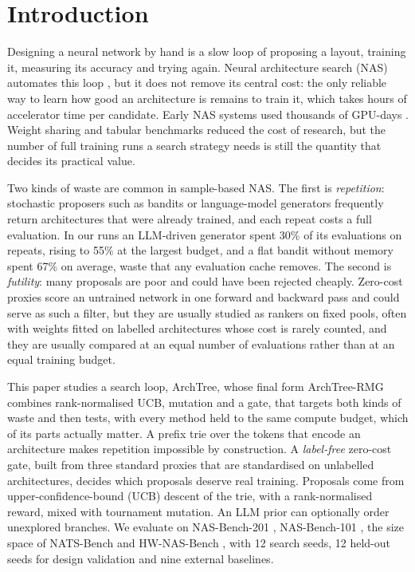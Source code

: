 \documentclass{sadhana}
\newcommand{\algname}{ArchTree}
\newcommand{\rmg}{ArchTree-RMG}
\begin{document}
\corres
\volnum{}
\issuenum{}
\monthyear{}
\pgfirst{}
\pglast{}
\doinum{}
\articleType{}


\section{Introduction}\label{sec:intro}

Designing a neural network by hand is a slow loop of proposing a layout, training it, measuring its accuracy and trying again. Neural architecture search (NAS) automates this loop \cite{zoph2017,elsken2019,ren2021}, but it does not remove its central cost: the only reliable way to learn how good an architecture is remains to train it, which takes hours of accelerator time per candidate. Early NAS systems used thousands of GPU-days \cite{zoph2017,real2017}. Weight sharing \cite{pham2018,liu2019} and tabular benchmarks \cite{ying2019,dong2020,dong2022} reduced the cost of research, but the number of full training runs a search strategy needs is still the quantity that decides its practical value.

Two kinds of waste are common in sample-based NAS. The first is \emph{repetition}: stochastic proposers such as bandits or language-model generators frequently return architectures that were already trained, and each repeat costs a full evaluation. In our runs an LLM-driven generator spent 30\% of its evaluations on repeats, rising to 55\% at the largest budget, and a flat bandit without memory spent 67\% on average, waste that any evaluation cache removes. The second is \emph{futility}: many proposals are poor and could have been rejected cheaply. Zero-cost proxies \cite{abdelfattah2021,mellor2021,tanaka2020,krishnakumar2022} score an untrained network in one forward and backward pass and could serve as such a filter, but they are usually studied as rankers on fixed pools, often with weights fitted on labelled architectures whose cost is rarely counted, and they are usually compared at an equal number of evaluations rather than at an equal training budget.

This paper studies a search loop, \algname, whose final form \rmg{} combines rank-normalised UCB, mutation and a gate, that targets both kinds of waste and then tests, with every method held to the same compute budget, which of its parts actually matter. A prefix trie over the tokens that encode an architecture makes repetition impossible by construction. A \emph{label-free} zero-cost gate, built from three standard proxies that are standardised on unlabelled architectures, decides which proposals deserve real training. Proposals come from upper-confidence-bound (UCB) descent of the trie, with a rank-normalised reward, mixed with tournament mutation. An LLM prior can optionally order unexplored branches. We evaluate on NAS-Bench-201 \cite{dong2020}, NAS-Bench-101 \cite{ying2019}, the size space of NATS-Bench \cite{dong2022} and HW-NAS-Bench \cite{li2021hw}, with 12 search seeds, 12 held-out seeds for design validation and nine external baselines.
\end{document}
